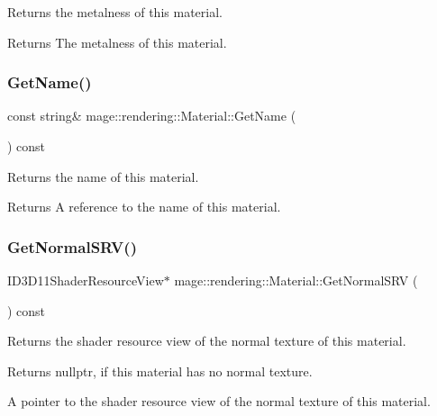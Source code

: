 Returns the metalness of this material.

\begin{DoxyReturn}{Returns}
The metalness of this material. 
\end{DoxyReturn}
\mbox{\label{classmage_1_1rendering_1_1_material_ab94089dbe7d1b242fad455e9c233a78c}} 
\subsubsection{\texorpdfstring{Get\+Name()}{GetName()}}
{\footnotesize\ttfamily const string\& mage\+::rendering\+::\+Material\+::\+Get\+Name (\begin{DoxyParamCaption}{ }\end{DoxyParamCaption}) const\hspace{0.3cm}{\ttfamily [noexcept]}}

Returns the name of this material.

\begin{DoxyReturn}{Returns}
A reference to the name of this material. 
\end{DoxyReturn}
\mbox{\label{classmage_1_1rendering_1_1_material_a8617392cee8e8609671be3f4147a5934}} 
\subsubsection{\texorpdfstring{Get\+Normal\+S\+R\+V()}{GetNormalSRV()}}
{\footnotesize\ttfamily I\+D3\+D11\+Shader\+Resource\+View$\ast$ mage\+::rendering\+::\+Material\+::\+Get\+Normal\+S\+RV (\begin{DoxyParamCaption}{ }\end{DoxyParamCaption}) const\hspace{0.3cm}{\ttfamily [noexcept]}}

Returns the shader resource view of the normal texture of this material.

\begin{DoxyReturn}{Returns}
{\ttfamily nullptr}, if this material has no normal texture. 

A pointer to the shader resource view of the normal texture of this material. 
\end{DoxyReturn}
\mbox{\label{classmage_1_1rendering_1_1_material_a1ae7786ebd627d3e7ecaf2dc671f497d}} 
